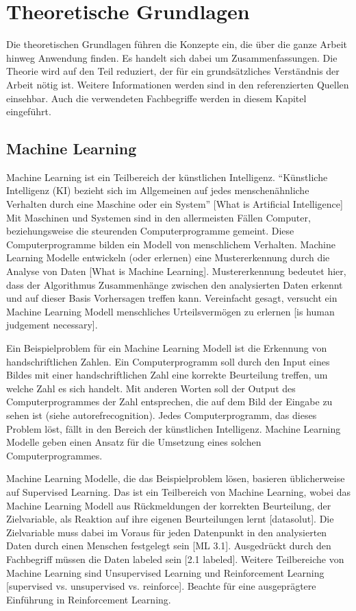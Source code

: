 \chapter{Theoretische Grundlagen}\label{chap:t}
Die theoretischen Grundlagen führen die Konzepte ein, die über die ganze Arbeit
hinweg Anwendung finden. Es handelt sich dabei um Zusammenfassungen. Die Theorie
wird auf den Teil reduziert, der für ein grundsätzliches Verständnis der Arbeit
nötig ist. Weitere Informationen werden sind in den referenzierten Quellen
einsehbar. Auch die verwendeten Fachbegriffe werden in diesem Kapitel
eingeführt. 

\section{Machine Learning}\label{chap:t_ml}
Machine Learning ist ein Teilbereich der künstlichen Intelligenz. ``Künstliche
Intelligenz (KI) bezieht sich im Allgemeinen auf jedes menschenähnliche
Verhalten durch eine Maschine oder ein System'' [What is Artificial
Intelligence] Mit Maschinen und Systemen sind in den allermeisten Fällen
Computer, beziehungsweise die steurenden Computerprogramme gemeint. Diese
Computerprogramme bilden ein Modell von menschlichem Verhalten. Machine Learning
Modelle entwickeln (oder erlernen) eine Mustererkennung durch die Analyse von
Daten [What is Machine Learning]. Mustererkennung bedeutet hier, dass der
Algorithmus Zusammenhänge zwischen den analysierten Daten erkennt und auf dieser
Basis Vorhersagen treffen kann. Vereinfacht gesagt, versucht ein Machine
Learning Modell menschliches Urteilsvermögen zu erlernen [is human judgement
necessary].

Ein Beispielproblem für ein Machine Learning Modell ist die Erkennung von
handschriftlichen Zahlen. Ein Computerprogramm soll durch den Input eines Bildes
mit einer handschriftlichen Zahl eine korrekte Beurteilung treffen, um welche
Zahl es sich handelt. Mit anderen Worten soll der Output des Computerprogrammes
der Zahl entsprechen, die auf dem Bild der Eingabe zu sehen ist (siehe autoref{recognition}). Jedes
Computerprogramm, das dieses Problem löst, fällt in den Bereich der künstlichen
Intelligenz. Machine Learning Modelle geben einen Ansatz für die Umsetzung eines
solchen Computerprogrammes.


Machine Learning Modelle, die das Beispielproblem lösen, basieren üblicherweise 
auf Supervised Learning. Das ist ein Teilbereich von Machine Learning, wobei das
Machine Learning Modell aus Rückmeldungen der korrekten Beurteilung, der
Zielvariable, als Reaktion auf ihre eigenen Beurteilungen lernt [datasolut]. Die
Zielvariable muss dabei im Voraus für jeden Datenpunkt in den analysierten Daten
durch einen Menschen festgelegt sein [ML 3.1]. Ausgedrückt durch den Fachbegriff müssen die
Daten labeled sein [2.1 labeled]. Weitere Teilbereiche von Machine Learning sind
Unsupervised Learning und Reinforcement Learning [supervised vs. unsupervised
vs. reinforce]. Beachte  für eine ausgeprägtere Einführung
in Reinforcement Learning.

